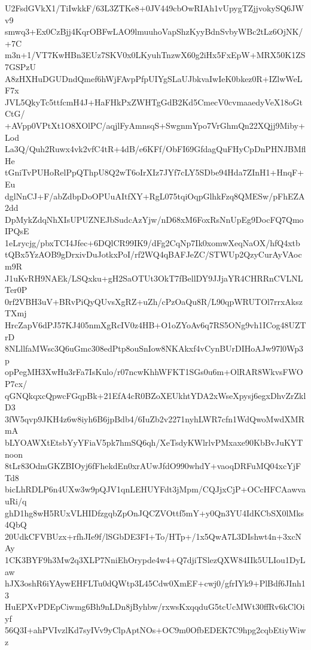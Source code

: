 U2FsdGVkX1/TiIwkkF/63L3ZTKe8+0JV449cbOwRIAh1vUpygTZjjvokySQ6JWv9
smwq3+Ex0CzBjj4KqrOBFwLAO9lmuuhoVapShzKyyBdnSvbyWBc2tLz6OjNK/+7C
m3n+1/VT7KwHBn3EUz7SKV0x0LKyuhTnzwX60g2iHx5FxEpW+MRX50K1ZS7GSPzU
A8zHXHuDGUDndQmef6hWjFAvpPfpUIYgSLaUJbkvaIwIeK0bkez0R+IZlwWeLF7x
JVL5QkyTc5ttfcmH4J+HaFHkPxZWHTgGdB2Kd5CmecV0cvmaaedyVeX18oGtCtG/
+AVpp0VPtXt1O8XOlPC/aqjlFyAmnsqS+SwgnmYpo7VrGhmQn22XQjj9Miby+Lod
La3Q/Quh2Ruwx4vk2vfC4tR+4dB/e6KFf/ObFI69GfdagQuFHyCpDnPHNJBMflHe
tGniTvPUHoRelPpQThpU8Q2wT6oIrXIz7JYf7cLY5SDbe94Hda7ZInH1+HnqF+Eu
dglNnCJ+F/abZdbpDoOPUuAItfXY+RgL075tqiOqpGlhkFzq8QMESw/pFhEZA2dd
DpMykZdqNhXIsUPUZNEJbSudcAzYjw/nD68xM6FoxRsNnUpEg9DocFQ7QmoIPQsE
1eLrycjg/pbxTCI4Jfec+6DQlCR99IK9/dFg2CqNp7Ik0xomwXeqNaOX/hfQ4xtb
tQBx5YzAOB9gDrxivDuJotkxPoI/rf2WQ4qBAFJeZC/STWUp2QzyCurAyVAocm9R
J1uKvRH9NAEk/LSQxku+gH2SaOTUt3OkT7fBellDY9JJjaYR4CHRRnCVLNLTer0P
0rf2VBH3uV+BRvPiQyQUvsXgRZ+uZh/cPzOaQu8R/L90qpWRUTOl7rrxAkszTXmj
HrcZapV6dPJ57KJ405nmXgRcIV0z4HB+O1oZYoAv6q7RS5ONg9vh1ICog48UZTrD
8NLllfaMWsc3Q6uGmc308edPtp8ouSnIow8NKAkxf4vCynBUrDIHoAJw97l0Wp3p
opPegMH3XwHu3rFa7IsKulo/r07ncwKhhWFKT1SGs0u6m+OlRAR8WkvsFWOP7cx/
qGNQkqxcQpwcFGqpBk+21EfA4cR0BZoXEUkhtYDA2xWseXpysj6egxDhvZrZklD3
3fW5qvp9JKH4z6w8iyh6B6jpBdb4/6IuZb2v2271nyhLWR7cfn1WdQwoMwdXMRmA
bLYOAWXtEtsbYyYFiaV5pk7hmSQ6qh/XeTsdyKWlrlvPMxaxe90KbBvJuKYTnoon
8tLr83OdmGKZBIOyj6fFhekdEn0xrAUwJfdO990whdY+vaoqDRFuMQ04xcYjFTd8
bicLhRDLP6n4UXw3w9pQJV1qnLEHUYFdt3jMpm/CQJjxCjP+OCcHFCAawvauRi/q
ghD1hg8wH5RUxVLHIDfzgqbZpOnJQCZVOttf5mY+y0Qn3YU4IdKCbSX0lMks4QbQ
20UdkCFVBUzx+rfhJIe9f/lSGbDE3FI+To/HTp+/1x5QwA7L3DIshwt4n+3xcNAy
1CK3BYF9h3Mw2q3XLP7NniEhOrypde4w4+Q7djiTSlezQXW84IIk5ULIou1DyLaw
hJX3oshR6iYAywEHFLTu0dQWtp3L45Cdw0XmEF+cwj0/gfrIYk9+PlBdf6JInh13
HuEPXvPDEpCiwmg6Bh9nLDn8jByhbw/rxwsKxqqduG5tcUcMWt30ffRv6kClOiyf
56Q3I+ahPVIvzlKd7syIVv9yClpAptNOs+OC9m0OfbEDEK7C9hpg2cqbEtiyWiwz
